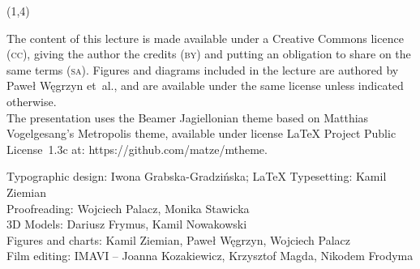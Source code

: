 {\begin{frame}[standout]
\begin{textblock}{4.2}
    \end{textblock}





    \begin{textblock}{11}(1,4)

      \begin{flushleft}

        \mdseries

        \footnotesize

        \RaggedRight

        \color{jFrametitleFGColor}

        The content of this lecture is made available under a Creative
        Commons licence (\textsc{cc}), giving the author the credits
        (\textsc{by}) and putting an obligation to share on the same terms
        (\textsc{sa}). Figures and diagrams included in the lecture are
        authored by Paweł Węgrzyn et~al., and are available under the same
        license unless indicated otherwise.\\ The presentation uses the
        Beamer Jagiellonian theme based on Matthias Vogelgesang’s
        Metropolis theme, available under license \LaTeX{} Project
        Public License~1.3c at: 
        {https://github.com/matze/mtheme}.

        Typographic design: Iwona Grabska-Gradzińska;
        \LaTeX{} Typesetting: Kamil Ziemian \\
        Proofreading: Wojciech Palacz,
        Monika Stawicka \\
        3D Models: Dariusz Frymus, Kamil Nowakowski \\
        Figures and charts: Kamil Ziemian, Paweł Węgrzyn, Wojciech
        Palacz \\
        Film editing: IMAVI -- Joanna Kozakiewicz, Krzysztof Magda, Nikodem
        Frodyma

      \end{flushleft}

    \end{textblock}

  \end{frame}
}




